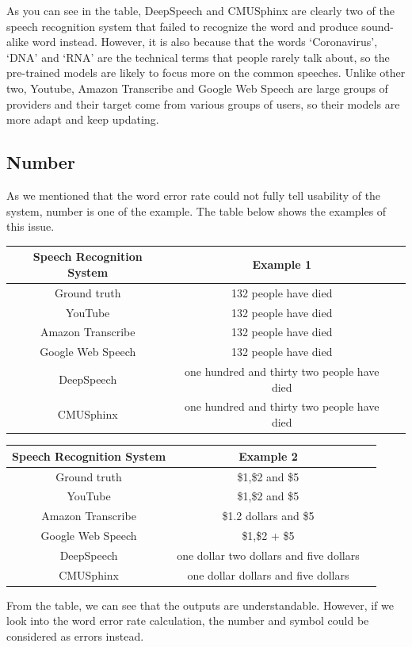 \documentclass[natbib]{muthesis}
\begin{document}
 As you can see in the table, DeepSpeech and CMUSphinx are clearly two of the speech recognition system that failed to recognize the word and produce sound-alike word instead. However, it is also because that the words `Coronavirus', `DNA' and `RNA' are the technical terms that people rarely talk about, so the pre-trained models are likely to focus more on the common speeches. Unlike other two, Youtube, Amazon Transcribe and Google Web Speech are large groups of providers and their target come from various groups of users, so their models are more adapt and keep updating.
 
 \subsection{Number}
 As we mentioned that the word error rate could not fully tell usability of the system, number is one of the example. The table below shows the examples of this issue.
 \begin{center}
 	\begin{tabular}{ |c|c|c| } 
 		\hline
 		Speech Recognition System & Example 1 \\ 
 		\hline
 		Ground truth & 132 people have died \\
 		YouTube & 132 people have died \\ 
 		Amazon Transcribe & 132 people have died \\
 		Google Web Speech & 132 people have died \\
 		DeepSpeech & one hundred and thirty two people have died \\
 		CMUSphinx & one hundred and thirty two people have died \\
 		\hline
 	\end{tabular}
 \end{center}
 \begin{center}
 	\begin{tabular}{ |c|c|c| } 
 		\hline
 		Speech Recognition System & Example 2 \\ 
 		\hline
 		Ground truth & \$1,\$2 and \$5\\
 		YouTube & \$1,\$2 and \$5\\ 
 		Amazon Transcribe & \$1.2 dollars and \$5\\
 		Google Web Speech & \$1,\$2 + \$5\\
 		DeepSpeech & one dollar two dollars and five dollars\\
 		CMUSphinx & one dollar dollars and five dollars\\
 		\hline
 	\end{tabular}
 \end{center}
 From the table, we can see that the outputs are understandable. However, if we look into the word error rate calculation, the number and symbol could be considered as errors instead.
 
\end{document}
